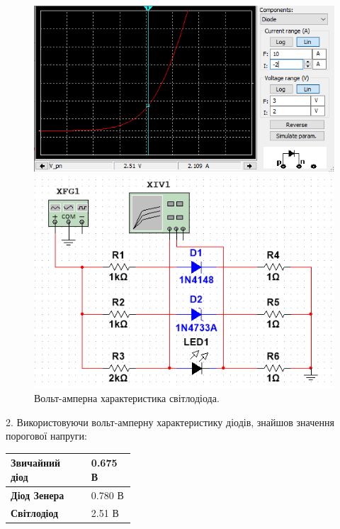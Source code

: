\documentclass{article}
\begin{document}
\begin{normalsize}
	\begin{figure}[H]
		\begin{minipage}[t]{0.55\textwidth}
			\centering
			\includegraphics[width=\textwidth]{31}
		\end{minipage}
		\hfill
		\begin{minipage}[t]{0.35\textwidth}
			\centering
			\includegraphics[width=\textwidth]{32}
		\end{minipage}
		\caption{Вольт-амперна характеристика світлодіода.}
	\end{figure}
	
	2. Використовуючи вольт-амперну характеристику діодів, знайшов значення порогової напруги:
	
	\begin{table}[H]
		\centering
		\renewcommand*\arraystretch{1.3}
		\begin{tabular}{|p{0.25\linewidth}|p{0.1\linewidth}|}
			\hline
			\textbf{Звичайний діод} & 0.675 В\\
			\hline
			\textbf{Діод Зенера} & 0.780 В\\
			\hline
			\textbf{Світлодіод} & 2.51 В\\
			\hline
		\end{tabular}
	\end{table}
	

\end{normalsize}
\end{document}
